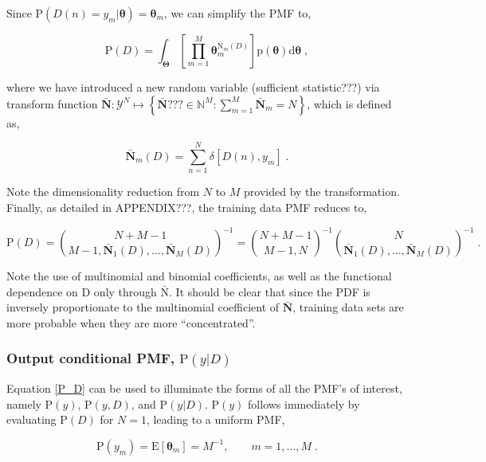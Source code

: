 \documentclass[12pt]{article}
\begin{document}
Since $\text{P}(D(n) = y_m | \bm{\theta}) = \bm{\theta}_m$, we can simplify the PMF to,

\begin{equation}
\text{P}(D) = \int_{\bm{\Theta}} \left[ \prod_{m=1}^M \bm{\theta}_m^{\bar{\bm{\mathrm{N}}}_m(D)} \right] \text{p}(\bm{\theta}) \mathrm{d}\bm{\theta} \;,
\end{equation}

where we have introduced a new random variable (sufficient statistic???) via transform function $\bar{\bm{N}}: \mathcal{Y}^N \mapsto \left\{ \bar{\bm{N}}??? \in \mathbb{N}^M: \sum_{m=1}^M \bar{\bm{N}}_m = N \right\}$, which is defined as,

\begin{equation}
\bar{\bm{N}}_m(D) = \sum_{n=1}^N \delta[D(n),y_m] \;.
\end{equation}

Note the dimensionality reduction from $N$ to $M$ provided by the transformation. Finally, as detailed in APPENDIX???, the training data PMF reduces to,

\begin{equation} \label{P_D}
\text{P}(D) = \binom{N+M-1}{M-1,\bar{\bm{N}}_1(D),\ldots,\bar{\bm{N}}_M(D)}^{-1} 
= \binom{N+M-1}{M-1,N}^{-1} \binom{N}{\bar{\bm{N}}_1(D),\ldots,\bar{\bm{N}}_M(D)}^{-1} \;.
\end{equation}

Note the use of multinomial and binomial coefficients, as well as the functional dependence on $\mathrm{D}$ only through $\bar{\bm{\mathrm{N}}}$. It should be clear that since the PDF is inversely proportionate to the multinomial coefficient of $\bar{\bm{N}}$, training data sets are more probable when they are more ``concentrated''. 





\subsubsection{Output conditional PMF, $\text{P}(y | D)$}

Equation \eqref{P_D} can be used to illuminate the forms of all the PMF's of interest, namely $\text{P}(y)$, $\text{P}(y,D)$, and $\text{P}(y | D)$.  $\text{P}(y)$ follows immediately by evaluating $\text{P}(D)$ for $N=1$, leading to a uniform PMF,

\begin{equation}
\text{P}(y_m) = \text{E}[\bm{\theta}_m] = M^{-1}, \qquad m=1,\ldots,M \;.
\end{equation}
\end{document}
